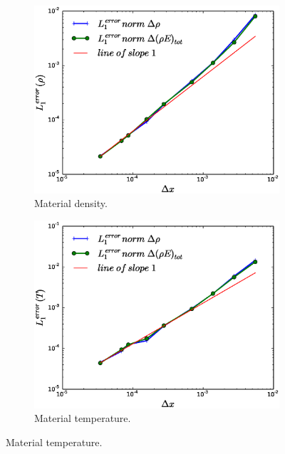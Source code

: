 \documentclass[times,doublespace]{fldauth}%
\begin{document}
\begin{figure}[ht]
    \centering
    \begin{subfigure}{0.49\textwidth}
    \includegraphics[width=\linewidth]{figures/dpt-xs/mass-energy-diff-scd-method-density-convergence.eps}
    \caption{Material density.}\label{fig:mach-3-dpt-xs-density-conv}
    \end{subfigure}
%
    \begin{subfigure}{0.49\textwidth}    
    \includegraphics[width=\linewidth]{figures/dpt-xs/mass-energy-diff-scd-method-mat-temp-convergence.eps}
    \caption{Material temperature.}\label{fig:mach-3-dpt-xs-temp-conv}
    \end{subfigure} 

\end{figure}
\end{document}
